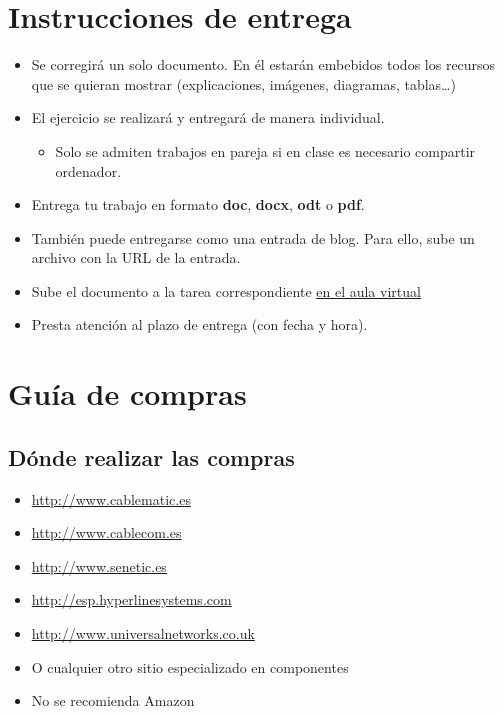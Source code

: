 \documentclass[a4paper]{article}
\begin{document}
\section{Instrucciones de entrega}
\label{sec:org000000c}
\begin{itemize}
\item Se corregirá un solo documento. En él estarán embebidos todos los recursos que se quieran mostrar (explicaciones, imágenes, diagramas, tablas\ldots{})
\item El ejercicio se realizará y entregará de manera individual.
\begin{itemize}
\item Solo se admiten trabajos en pareja si en clase es necesario compartir ordenador.
\end{itemize}
\item Entrega tu trabajo en formato \textbf{doc}, \textbf{docx}, \textbf{odt} o \textbf{pdf}.
\item También puede entregarse como una entrada de blog. Para ello, sube un archivo con la URL de la entrada.
\item Sube el documento a la tarea correspondiente \href{https://aulavirtual3.educa.madrid.org/ies.alonsodeavellan.alcala}{en el aula virtual}
\item Presta atención al plazo de entrega (con fecha y hora).
\end{itemize}



\section{Guía de compras}
\label{sec:org0000018}
\subsection{Dónde realizar las compras}
\label{sec:org000000f}
\begin{itemize}
\item \url{http://www.cablematic.es}
\item \url{http://www.cablecom.es}
\item \url{http://www.senetic.es}
\item \url{http://esp.hyperlinesystems.com}
\item \url{http://www.universalnetworks.co.uk}
\item O cualquier otro sitio especializado en componentes
\item No se recomienda Amazon
\end{itemize}
\end{document}
